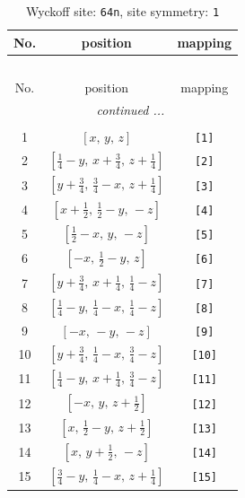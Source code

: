 \documentclass[fleqn,8pt]{jsarticle}
\begin{document}
\begin{longtable}{ccc}
\caption{Wyckoff site: {\tt 64n}, site symmetry: {\tt 1}}
 \\
 \hline \hline
No. & position & mapping \\ \hline \endfirsthead

\multicolumn{2}{l}{\tablename\ \thetable{}} \\
 \hline \hline
No. & position & mapping \\ \hline \endhead

 \hline \hline
\multicolumn{2}{r}{\footnotesize\it continued ...} \\ \endfoot

 \hline \hline
\multicolumn{2}{r}{} \\ \endlastfoot

1 & $\left[ x,\, y,\, z \right]$ & {\tt [1]} \\ \hline
2 & $\left[ \frac{1}{4} - y,\, x + \frac{3}{4},\, z + \frac{1}{4} \right]$ & {\tt [2]} \\ \hline
3 & $\left[ y + \frac{3}{4},\, \frac{3}{4} - x,\, z + \frac{1}{4} \right]$ & {\tt [3]} \\ \hline
4 & $\left[ x + \frac{1}{2},\, \frac{1}{2} - y,\, - z \right]$ & {\tt [4]} \\ \hline
5 & $\left[ \frac{1}{2} - x,\, y,\, - z \right]$ & {\tt [5]} \\ \hline
6 & $\left[ - x,\, \frac{1}{2} - y,\, z \right]$ & {\tt [6]} \\ \hline
7 & $\left[ y + \frac{3}{4},\, x + \frac{1}{4},\, \frac{1}{4} - z \right]$ & {\tt [7]} \\ \hline
8 & $\left[ \frac{1}{4} - y,\, \frac{1}{4} - x,\, \frac{1}{4} - z \right]$ & {\tt [8]} \\ \hline
9 & $\left[ - x,\, - y,\, - z \right]$ & {\tt [9]} \\ \hline
10 & $\left[ y + \frac{3}{4},\, \frac{1}{4} - x,\, \frac{3}{4} - z \right]$ & {\tt [10]} \\ \hline
11 & $\left[ \frac{1}{4} - y,\, x + \frac{1}{4},\, \frac{3}{4} - z \right]$ & {\tt [11]} \\ \hline
12 & $\left[ - x,\, y,\, z + \frac{1}{2} \right]$ & {\tt [12]} \\ \hline
13 & $\left[ x,\, \frac{1}{2} - y,\, z + \frac{1}{2} \right]$ & {\tt [13]} \\ \hline
14 & $\left[ x,\, y + \frac{1}{2},\, - z \right]$ & {\tt [14]} \\ \hline
15 & $\left[ \frac{3}{4} - y,\, \frac{1}{4} - x,\, z + \frac{1}{4} \right]$ & {\tt [15]} \\ \hline

\end{longtable}
\end{document}
